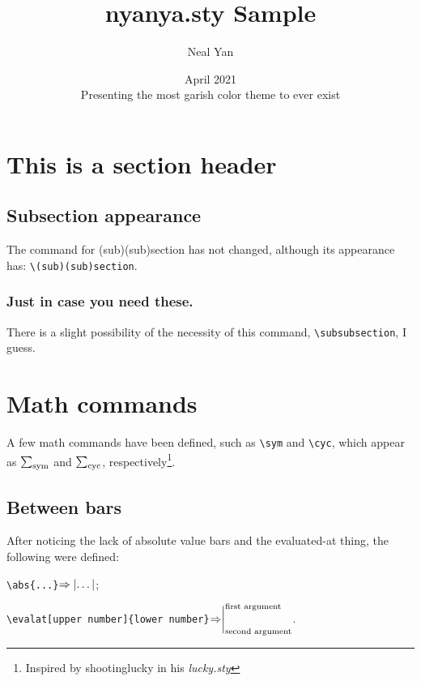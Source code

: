 \documentclass{article}
\title{nyanya.sty Sample}
\author{Neal Yan}
\date{April 2021\\ Presenting the most garish color theme to ever exist}
\begin{document}
\maketitle

\toc

\section{This is a section header}
\subsection{Subsection appearance}

The command for (sub)(sub)section has not changed, although its appearance has: \texttt{\textbackslash(sub)(sub)section}.

\subsubsection{Just in case you need these.}

There is a slight possibility of the necessity of this command, \texttt{\textbackslash subsubsection}, I guess.

\section{Math commands}

A few math commands have been defined, such as \texttt{\textbackslash sym} and \texttt{\textbackslash cyc}, which appear as $\sym$ and $\cyc$, respectively\footnote{Inspired by shootinglucky in his \emph{lucky.sty}}.

\subsection{Between bars}

After noticing the lack of absolute value bars and the evaluated-at thing, the following were defined: 

\texttt{\textbackslash abs\{...\}}$\Rightarrow\abs{\dots}$;

\texttt{\textbackslash evalat[upper number]\{lower number\}}$\Rightarrow\evalat[\text{first argument}]{\text{second argument}}$.
\end{document}
